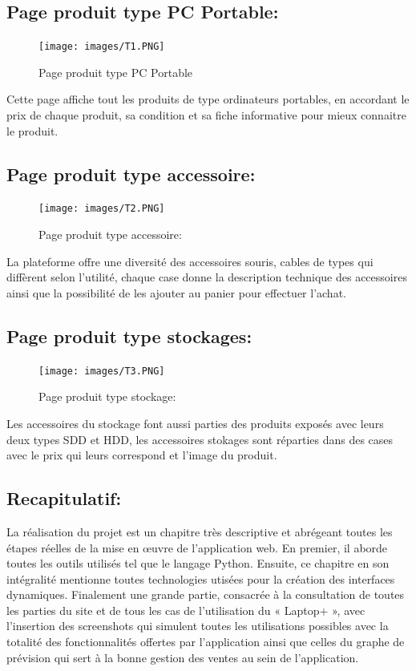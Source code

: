 \documentclass[a4paper]{report}
\begin{document}
\begin{doublespace}
\begin{doublespace}
\begin{doublespace}
\begin{doublespace}
\begin{doublespace}
\begin{doublespace}
\subsection{Page produit type PC Portable:}
\begin{figure}[H]
\begin{center}
 \texttt{[image: images/T1.PNG]}
 \caption{Page produit type PC Portable}
 \end{center}
\end{figure}
Cette page affiche tout les produits de type ordinateurs portables, en accordant le prix de chaque produit, sa condition et sa fiche informative pour mieux connaitre le produit.
\subsection{Page produit type accessoire:}
\begin{figure}[H]
\begin{center}
 \texttt{[image: images/T2.PNG]}
 \caption{Page produit type accessoire:}
 \end{center}
\end{figure}

La plateforme offre une diversité des accessoires souris, cables de types qui diffèrent selon l'utilité, chaque case donne la description technique des accessoires ainsi que la possibilité de les ajouter au panier pour effectuer l'achat.

\subsection{Page produit type stockages:}
\begin{figure}[H]
\begin{center}
 \texttt{[image: images/T3.PNG]}
 \caption{Page produit type stockage:}
 \end{center}
\end{figure}

Les accessoires du stockage font aussi parties des produits exposés avec leurs deux types SDD et HDD, les accessoires stokages sont réparties dans des cases avec le prix qui leurs correspond et l'image du produit. 
\subsection{Recapitulatif:}
La réalisation du projet est un chapitre très descriptive et abrégeant toutes les étapes réelles de la mise en œuvre de l'application web. En premier, il aborde toutes les outils utilisés tel que le langage  Python. Ensuite, ce chapitre en son intégralité mentionne toutes technologies utisées pour la création des interfaces dynamiques. Finalement une grande partie, consacrée à la consultation de toutes les parties du site et de tous les cas de l’utilisation du « Laptop+ », avec l’insertion des screenshots qui simulent toutes les utilisations possibles avec la totalité des fonctionnalités offertes par l'application ainsi que celles du graphe de prévision qui sert à la bonne gestion des ventes au sein de l'application.
\newpage

\end{doublespace}
\end{doublespace}
\end{doublespace}
\end{doublespace}
\end{doublespace}
\end{doublespace}
\end{document}
